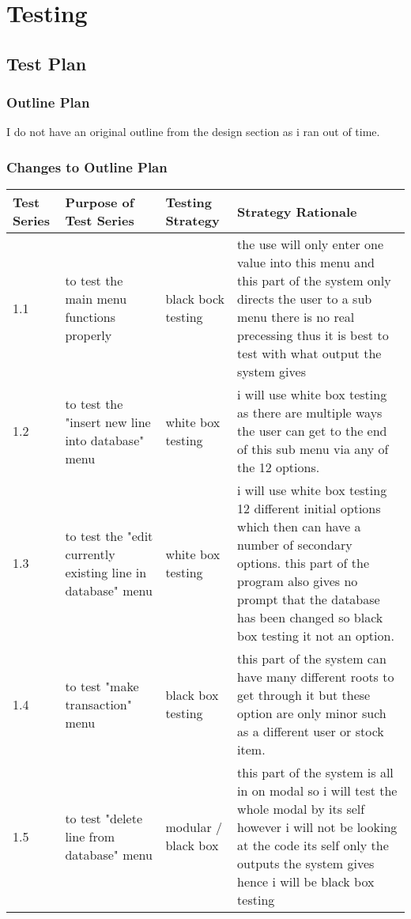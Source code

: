 \chapter{Testing}

\section{Test Plan}

\begin{landscape}

\subsection{Outline Plan}

I do not have an original outline from the design section as i ran out of time.

\subsection{Changes to Outline Plan}

\begin{center}
    \begin{tabular}{|p{2cm}|p{5cm}|p{5cm}|p{4cm}|}
        \hline
        \textbf{Test Series} & \textbf{Purpose of Test Series} & \textbf{Testing Strategy} & \textbf{Strategy Rationale}\\  \hline

        1.1 & to test the main menu functions properly  & black bock testing & the use will only enter one value into this menu and this part of the system only directs the user to a sub menu there is no real precessing thus it is best to test with what output the system gives \\ \hline
1.2 &to test the "insert new line into database" menu & white box testing & i will use white box testing as there are multiple ways the user can get to the end of this sub menu via any of the 12 options.\\ \hline
1.3 & to test the "edit currently existing line in database" menu & white box testing & i will use white box testing 12 different initial options which then can have a number of secondary options. this part of the program also gives no prompt that the database has been changed so black box testing it not an option. \\ \hline
1.4 & to test "make transaction" menu & black box testing & this part of the system can have many different roots to get through it but these option are only minor such as a different user or stock item. \\ \hline
1.5 & to test "delete line from database" menu & modular / black box & this part of the system is all in on modal so i will test the whole modal by its self however i will not be looking at the code its self only the outputs the system gives hence i will be black box testing \\ \hline


\end{tabular}
\end{center}
\end{landscape}
